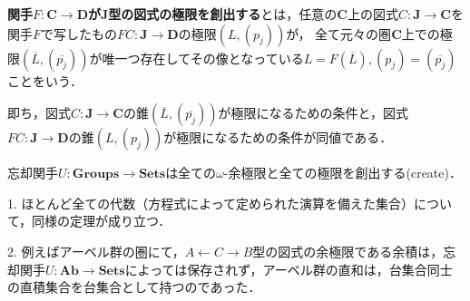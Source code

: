\documentclass[uplatex, 12pt, dvipdfmx]{jsarticle}
\begin{document}
\vspace{3cm}

\begin{definition}
    \textbf{関手$F:\mathbf{C\to D}$が$\mathbf{J}$型の図式の極限を創出する}とは，任意の$\mathbf{C}$上の図式$C:\mathbf{J\to C}$を関手$F$で写したもの$FC:\mathbf{J\to D}$の極限$(L,(p_j))$が，
    全て元々の圏$\mathbf{C}$上での極限$(\overline{L},(\overline{p_j}))$が唯一つ存在してその像となっている$L=F(\overline{L}), (p_j)=(\overline{p_j})$ことをいう．

    即ち，図式$C:\mathbf{J\to C}$の錐$(\overline{L},(\overline{p_j}))$が極限になるための条件と，図式$FC:\mathbf{J\to D}$の錐$(L,(p_j))$が極限になるための条件が同値である．
\end{definition}

\vspace{3cm}

\begin{proposition}
    忘却関手$U:\mathbf{Groups\to Sets}$は全ての$\omega$-余極限と全ての極限を創出する(create)．
\end{proposition}
\begin{remark*}
    1. ほとんど全ての代数（方程式によって定められた演算を備えた集合）について，同様の定理が成り立つ．

    2. 例えばアーベル群の圏にて，$A\leftarrow C\rightarrow B$型の図式の余極限である余積は，忘却関手$U:\mathbf{Ab\to Sets}$によっては保存されず，アーベル群の直和は，台集合同士の直積集合を台集合として持つのであった．
\end{remark*}

\vspace{3cm}
\end{document}
